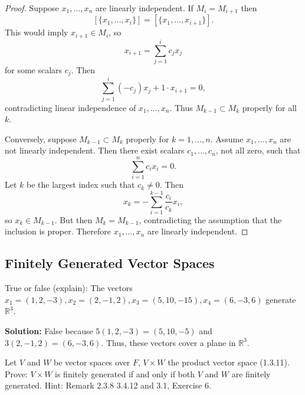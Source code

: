\begin{proof}
    Suppose $x_1, \ldots, x_n$ are linearly independent.
    If $M_i = M_{i+1}$ then
    \[
    [\{x_1, \ldots, x_i\}] = [\{x_1, \ldots, x_{i+1}\}].
    \]
    This would imply $x_{i+1} \in M_i$, so
    \[
    x_{i+1} = \sum_{j=1}^i c_j x_j
    \]
    for some scalars $c_j$.
    Then
    \[
    \sum_{j=1}^i (-c_j)x_j + 1\cdot x_{i+1} = 0,
    \]
    contradicting linear independence of $x_1, \ldots, x_n$.
    Thus $M_{k-1} \subset M_k$ properly for all $k$.

    Conversely, suppose $M_{k-1} \subset M_k$ properly for $k=1,\ldots,n$.
    Assume $x_1,\ldots,x_n$ are not linearly independent. Then there exist scalars
    $c_1,\ldots,c_n$, not all zero, such that
    \[
    \sum_{i=1}^n c_i x_i = 0.
    \]
    Let $k$ be the largest index such that $c_k \neq 0$. Then
    \[
    x_k = -\sum_{i=1}^{k-1} \frac{c_i}{c_k} x_i,
    \]
    so $x_k \in M_{k-1}$.
    But then $M_k = M_{k-1}$, contradicting the assumption that the inclusion is proper.
    Therefore $x_1,\ldots,x_n$ are linearly independent.
\end{proof}

\subsection{Finitely Generated Vector Spaces}

\begin{tcolorbox}[title=Problem 1, breakable]
    True or false (explain): The vectors 
    $x_1 = (1, 2, -3), x_2 = (2, -1, 2), x_3 = (5, 10, -15), x_4 = (6, -3, 6)$
    generate $\mathbb{R}^3$.
\end{tcolorbox}

\textbf{Solution: }
False because $5(1, 2, -3) = (5, 10, -5)$
    and $3(2, -1, 2) = (6, -3, 6)$.
Thus, these vectors cover a plane in $\mathbb{R}^3$.

\begin{tcolorbox}[title=Problem 3, breakable]
    Let $V$ and $W$ be vector spaces over $F$,
    $V \times W$ the product vector space 
    (1.3.11). Prove: $V \times W$ is finitely generated 
    if and only if both $V$ and $W$ are finitely generated.
    {Hint: Remark 2.3.8 3.4.12 and 3.1, Exercise 6.}
\end{tcolorbox}

